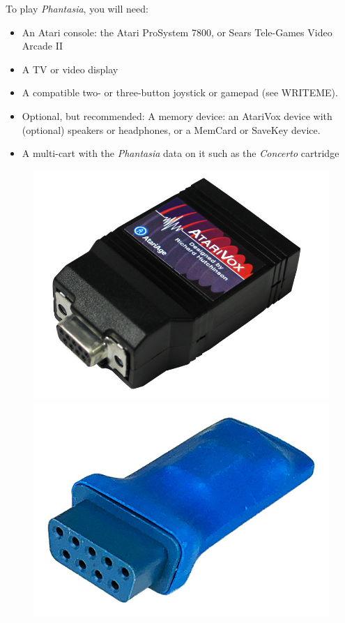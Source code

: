 \documentclass[10pt,twocolumn,openany,article]{memoir}
\begin{document}
To play \textit{Phantasia}, you will need:

\begin{itemize}
\item An Atari console: the Atari ProSystem 7800, or Sears
  Tele-Games Video Arcade II
\item A TV or video display
\item A compatible two- or three-button joystick or gamepad (see WRITEME).
\item Optional,  but recommended:  A memory  device: an  AtariVox device
  with  (optional)  speakers or  headphones,  or  a MemCard  or  SaveKey
  device.
\item A  multi-cart with the  \textit{Phantasia} data  on it such  as the
  \textit{Concerto} cartridge
\end{itemize}

\begin{figure}[b]
  \begin{center}
    \includegraphics[width=\columnwidth]{../Manual/AtariVox.jpeg}
    \includegraphics[width=\columnwidth]{../Manual/SaveKey.jpeg}
  \end{center}
\end{figure}
\end{document}
